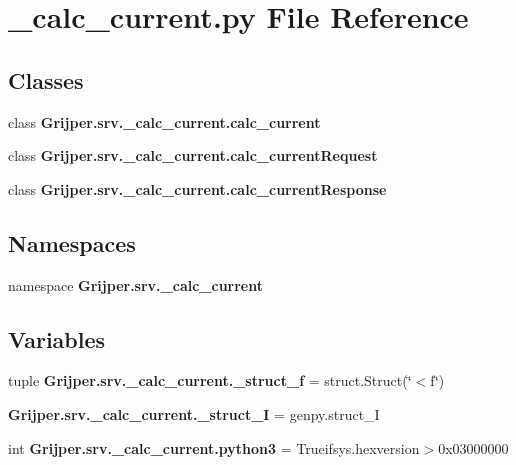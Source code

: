 \section{\-\_\-calc\-\_\-current.\-py File Reference}
\label{__calc__current_8py}
\subsection*{Classes}
\begin{DoxyCompactItemize}
\item 
class {\bf Grijper.\-srv.\-\_\-calc\-\_\-current.\-calc\-\_\-current}
\item 
class {\bf Grijper.\-srv.\-\_\-calc\-\_\-current.\-calc\-\_\-current\-Request}
\item 
class {\bf Grijper.\-srv.\-\_\-calc\-\_\-current.\-calc\-\_\-current\-Response}
\end{DoxyCompactItemize}
\subsection*{Namespaces}
\begin{DoxyCompactItemize}
\item 
namespace {\bf Grijper.\-srv.\-\_\-calc\-\_\-current}
\end{DoxyCompactItemize}
\subsection*{Variables}
\begin{DoxyCompactItemize}
\item 
tuple {\bf Grijper.\-srv.\-\_\-calc\-\_\-current.\-\_\-struct\-\_\-f} = struct.\-Struct(\char`\"{}$<$f\char`\"{})
\item 
{\bf Grijper.\-srv.\-\_\-calc\-\_\-current.\-\_\-struct\-\_\-\-I} = genpy.\-struct\-\_\-\-I
\item 
int {\bf Grijper.\-srv.\-\_\-calc\-\_\-current.\-python3} = Trueifsys.\-hexversion$>$0x03000000
\end{DoxyCompactItemize}

